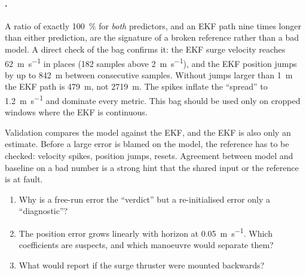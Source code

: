 \paragraph{.} A ratio of exactly \qty{100}{\percent} for
\emph{both} predictors, and an EKF path nine times longer than either prediction, are the
signature of a broken reference rather than a bad model. A direct check of the bag confirms it:
the EKF surge velocity reaches \qty{62}{\meter\per\second} in places (182 samples above
\qty{2}{\meter\per\second}), and the EKF position jumps by up to \qty{842}{\meter} between
consecutive samples. Without jumps larger than \qty{1}{\meter} the EKF path is \qty{479}{\meter},
not \qty{2719}{\meter}. The spikes inflate the ``spread'' to \qty{1.2}{\meter\per\second} and
dominate every metric. This bag should be used only on cropped windows where the EKF is
continuous.

\begin{keyidea}
Validation compares the model against the EKF, and the EKF is also only an estimate. Before a
large error is blamed on the model, the reference has to be checked: velocity spikes, position jumps,
resets. Agreement between model and baseline on a bad number is a strong hint that the shared
input or the reference is at fault.
\end{keyidea}

\begin{questions}
\begin{enumerate}
  \item Why is a free-run error the ``verdict'' but a re-initialised error only a ``diagnostic''?
  \item The position error grows linearly with horizon at \qty{0.05}{\meter\per\second}. Which
        coefficients are suspects, and which manoeuvre would separate them?
  \item What would  report if the surge thruster were mounted backwards?
\end{enumerate}
\end{questions}
